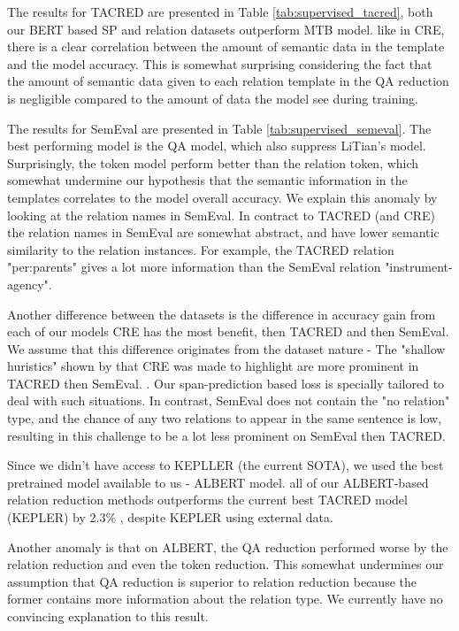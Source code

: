 \documentclass[11pt]{article}
\begin{document}
The results for TACRED are presented in  Table \ref{tab:supervised_tacred}, both our BERT based SP and relation datasets outperform MTB model. like in CRE, there is a clear correlation between the amount of semantic data in the template and the model accuracy. This is somewhat surprising considering the fact that the amount of semantic data given to each relation template in the QA reduction is negligible compared to the amount of data the model see during training.

The results for SemEval are presented in Table \ref{tab:supervised_semeval}. The best performing model is the QA model, which also suppress LiTian's model. Surprisingly, the token model perform better than the relation token, which somewhat undermine our hypothesis that the semantic information in the templates correlates to the model overall accuracy. We explain this anomaly by looking at the relation names in SemEval. In contract to TACRED (and CRE) the relation names in SemEval are somewhat abstract, and have lower semantic similarity to the relation instances. For example, the TACRED relation "per:parents" gives a lot more information than the SemEval relation "instrument-agency".

Another difference between the datasets is the difference in accuracy gain from each of our models CRE has the most benefit, then TACRED and then SemEval. We assume that this difference originates from the dataset nature - The "shallow huristics" shown by \cite{Rosenman2020} that CRE was made to highlight are more prominent in TACRED then SemEval. . Our span-prediction based loss is specially tailored to deal with such situations. In contrast, SemEval does not contain the "no relation" type, and the chance of any two relations to appear in the same sentence is low, resulting in this challenge to be a lot less prominent on SemEval then TACRED. 

Since we didn't have access to KEPLLER (the current SOTA), we used the best pretrained model available to us - ALBERT model. all of our ALBERT-based relation reduction methods outperforms the current best TACRED model (KEPLER) by 2.3\% , despite KEPLER using external data. 

Another anomaly is that on ALBERT, the QA reduction performed worse by the relation reduction and even the token reduction. This somewhat undermines our assumption that QA reduction is superior to relation reduction because the former contains more information about the relation type. We currently have no convincing explanation to this result. 
\end{document}
